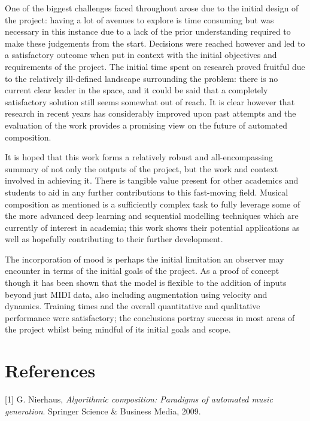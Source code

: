 \documentclass[12pt,]{article}
\begin{document}
One of the biggest challenges faced throughout arose due to the initial
design of the project: having a lot of avenues to explore is time
consuming but was necessary in this instance due to a lack of the prior
understanding required to make these judgements from the start.
Decisions were reached however and led to a satisfactory outcome when
put in context with the initial objectives and requirements of the
project. The initial time spent on research proved fruitful due to the
relatively ill-defined landscape surrounding the problem: there is no
current clear leader in the space, and it could be said that a
completely satisfactory solution still seems somewhat out of reach. It
is clear however that research in recent years has considerably improved
upon past attempts and the evaluation of the work provides a promising
view on the future of automated composition.

It is hoped that this work forms a relatively robust and
all-encompassing summary of not only the outputs of the project, but the
work and context involved in achieving it. There is tangible value
present for other academics and students to aid in any further
contributions to this fast-moving field. Musical composition as
mentioned is a sufficiently complex task to fully leverage some of the
more advanced deep learning and sequential modelling techniques which
are currently of interest in academia; this work shows their potential
applications as well as hopefully contributing to their further
development.

The incorporation of mood is perhaps the initial limitation an observer
may encounter in terms of the initial goals of the project. As a proof
of concept though it has been shown that the model is flexible to the
addition of inputs beyond just MIDI data, also including augmentation
using velocity and dynamics. Training times and the overall quantitative
and qualitative performance were satisfactory; the conclusions portray
success in most areas of the project whilst being mindful of its initial
goals and scope.

\hypertarget{references}{%
\section*{References}\label{references}}

\hypertarget{refs}{}
\leavevmode\hypertarget{ref-nierhaus2009algorithmic}{}%
{[}1{]} G. Nierhaus, \emph{Algorithmic composition: Paradigms of
automated music generation}. Springer Science \& Business Media, 2009.
\end{document}
